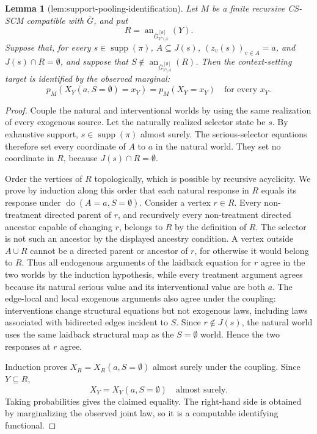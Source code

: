 \documentclass{article}
\newtheorem{lemma}{Lemma}
\begin{document}
\begin{lemma}[lem:support-pooling-identification]\label{lem:support-pooling-identification}
Let \(M\) be a finite recursive CS-SCM compatible with \(\bar G\), and put
\[R=\operatorname{an}_{\bar G^{[\emptyset]}_{V^\circ\setminus A}}(Y).\]
Suppose that, for every \(s\in\operatorname{supp}(\pi)\), \(A\subseteq J(s)\), \((z_v(s))_{v\in A}=a\), and \(J(s)\cap R=\emptyset\), and suppose that \(S\notin\operatorname{an}_{\bar G^{[\emptyset]}_{V\setminus A}}(R)\). Then the context-setting target is identified by the observed marginal:
\[p_M(X_Y(a,S=\emptyset)=x_Y)=p_M(X_Y=x_Y)\quad\text{for every }x_Y.\]
\end{lemma}
\begin{proof}
Couple the natural and interventional worlds by using the same realization of every exogenous source. Let the naturally realized selector state be \(s\). By exhaustive support, \(s\in\operatorname{supp}(\pi)\) almost surely. The serious-selector equations therefore set every coordinate of \(A\) to \(a\) in the natural world. They set no coordinate in \(R\), because \(J(s)\cap R=\emptyset\).

Order the vertices of \(R\) topologically, which is possible by recursive acyclicity. We prove by induction along this order that each natural response in \(R\) equals its response under \(\operatorname{do}(A=a,S=\emptyset)\). Consider a vertex \(r\in R\). Every non-treatment directed parent of \(r\), and recursively every non-treatment directed ancestor capable of changing \(r\), belongs to \(R\) by the definition of \(R\). The selector is not such an ancestor by the displayed ancestry condition. A vertex outside \(A\cup R\) cannot be a directed parent or ancestor of \(r\), for otherwise it would belong to \(R\). Thus all endogenous arguments of the laidback equation for \(r\) agree in the two worlds by the induction hypothesis, while every treatment argument agrees because its natural serious value and its interventional value are both \(a\). The edge-local and local exogenous arguments also agree under the coupling: interventions change structural equations but not exogenous laws, including laws associated with bidirected edges incident to \(S\). Since \(r\notin J(s)\), the natural world uses the same laidback structural map as the \(S=\emptyset\) world. Hence the two responses at \(r\) agree.

Induction proves \(X_R=X_R(a,S=\emptyset)\) almost surely under the coupling. Since \(Y\subseteq R\),
\[
X_Y=X_Y(a,S=\emptyset)\quad\text{almost surely}.
\]
Taking probabilities gives the claimed equality. The right-hand side is obtained by marginalizing the observed joint law, so it is a computable identifying functional.
\end{proof}
\end{document}
